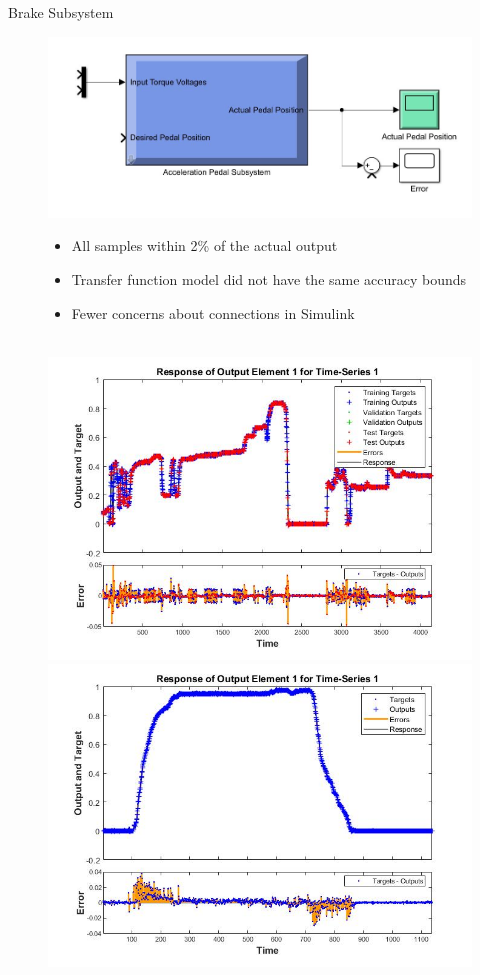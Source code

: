 \documentclass{beamer}
\begin{document}
\begin{frame}{Brake Subsystem}
  \begin{block}{}
\begin{figure}[H]
  			\centering \includegraphics[width=.45\linewidth , height=.37\textheight]{figs/img/accelerationSimulinkBlock.jpg}\quad%
			\centering \begin{minipage}[b][0.4\textheight][c]{.45\linewidth}  \begin{itemize}
			\item All samples within 2\% of the actual output
			\item Transfer function model did not have the same accuracy bounds
			\item Fewer concerns about connections in Simulink
			\end{itemize} \end{minipage}\\[1em]
			\centering \includegraphics[width=.45\linewidth , height=.37\textheight]{figs/img/brake_new_neuralNetworkFig.jpg}\quad%
			\centering \includegraphics[width=.45\linewidth , height=.37\textheight]{figs/img/brake_new_neuralNetworkFigLog2Test.jpg}
  		\end{figure}
	
  \end{block}

\end{frame}
\end{document}
